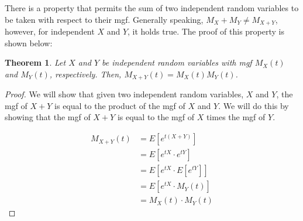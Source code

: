 \documentclass{article}
\newtheorem*{thm}{Theorem}
\begin{document}
There is a property that permits the sum of two independent random variables to be taken with respect to their mgf. Generally speaking, $M_X+M_Y \neq M_{X+Y}$, however, for independent $X$ and $Y$, it holds true. The proof of this property is shown below:

\begin{thm}
    Let $X$ and $Y$ be independent random variables with mgf $M_X(t)$ and $M_Y(t)$, respectively. Then, $M_{X+Y}(t) = M_X(t)M_Y(t)$.
\end{thm}

\begin{proof}
    We will show that given two independent random variables, $X$ and $Y$, the mgf of $X+Y$ is equal to the product of the mgf of $X$ and $Y$. We will do this by showing that the mgf of $X+Y$ is equal to the mgf of $X$ times the mgf of $Y$.

    \begin{align*}
        M_{X+Y}(t) &= E\left[e^{t(X+Y)}\right] \\
        &= E\left[e^{tX} \cdot e^{tY}\right] \\
        &= E\left[e^{tX} \cdot E\left[e^{tY}\right]\right] \\
        &= E\left[e^{tX} \cdot M_Y(t)\right] \\
        &= M_X(t) \cdot M_Y(t)  
    \end{align*}
\end{proof}
\end{document}
